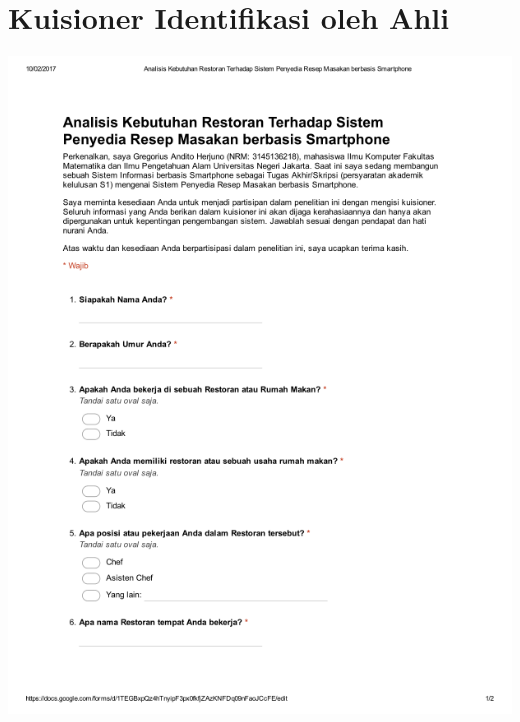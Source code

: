 \appendix 

\chapter{Kuisioner Identifikasi oleh Ahli}
\includegraphics[width=1\textwidth]{pdf/hal_1_ahli}


